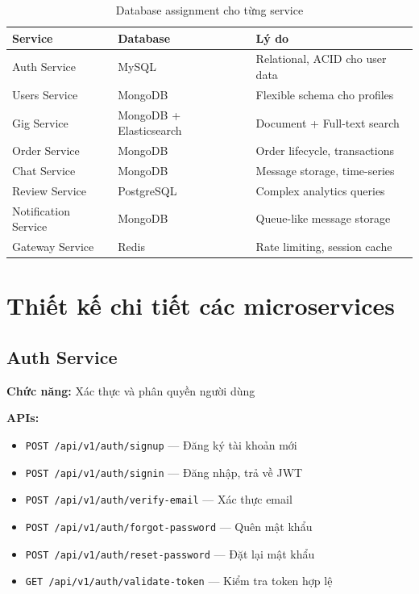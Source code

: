 \documentclass[12pt]{extreport}
\begin{document}
\begin{table}[H]
\centering
\begin{tabular}{|l|l|l|}
\hline
\textbf{Service} & \textbf{Database} & \textbf{Lý do} \\ \hline
Auth Service & MySQL & Relational, ACID cho user data \\ \hline
Users Service & MongoDB & Flexible schema cho profiles \\ \hline
Gig Service & MongoDB + Elasticsearch & Document + Full-text search \\ \hline
Order Service & MongoDB & Order lifecycle, transactions \\ \hline
Chat Service & MongoDB & Message storage, time-series \\ \hline
Review Service & PostgreSQL & Complex analytics queries \\ \hline
Notification Service & MongoDB & Queue-like message storage \\ \hline
Gateway Service & Redis & Rate limiting, session cache \\ \hline
\end{tabular}
\caption{Database assignment cho từng service}
\label{tab:database_assignment}
\end{table}

\section{Thiết kế chi tiết các microservices}

\subsection{Auth Service}

\textbf{Chức năng:} Xác thực và phân quyền người dùng

\textbf{APIs:}
\begin{itemize}
    \item \texttt{POST /api/v1/auth/signup} --- Đăng ký tài khoản mới
    \item \texttt{POST /api/v1/auth/signin} --- Đăng nhập, trả về JWT
    \item \texttt{POST /api/v1/auth/verify-email} --- Xác thực email
    \item \texttt{POST /api/v1/auth/forgot-password} --- Quên mật khẩu
    \item \texttt{POST /api/v1/auth/reset-password} --- Đặt lại mật khẩu
    \item \texttt{GET /api/v1/auth/validate-token} --- Kiểm tra token hợp lệ
\end{itemize}
\end{document}

